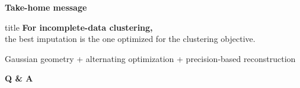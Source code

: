 \begin{frame}[plain]
    \begin{center}
        \vspace{0.8cm}
        {\Huge \textbf{Take-home message}}\\[0.7cm]

        \begin{beamercolorbox}[sep=1.2em, rounded=true, shadow=true, wd=0.88\textwidth, center]{title}
            \LARGE
            \textbf{For incomplete-data clustering,}\\[0.2cm]
            \textcolor{alertRed}{the best imputation is the one optimized for the clustering objective.}
        \end{beamercolorbox}

        \vspace{1.0cm}
        {\Large Gaussian geometry + alternating optimization + precision-based reconstruction}

        \vfill
        {\Huge \textbf{Q \& A}}
    \end{center}
\end{frame}
